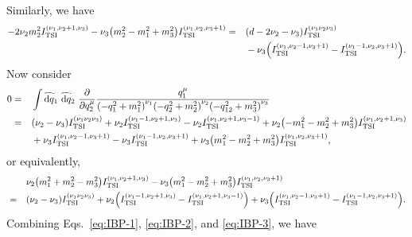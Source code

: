 \documentclass{article}
\begin{document}
        Similarly, we have
        \begin{equation}
            \begin{aligned}
                -2 \nu_2 m_2^2 \TSI{\nu_1, \nu_2 + 1, \nu_3} - \nu_3 \qty(m_2^2 - m_1^2 + m_3^2) \TSI{\nu_1, \nu_2, \nu_3 + 1} & = & & \qty(d - 2 \nu_2 - \nu_3) \TSI{\nu_1 \nu_2 \nu_3} \\
                & & & {} - \nu_3 \qty(\TSI{\nu_1, \nu_2 - 1, \nu_3 + 1} - \TSI{\nu_1 - 1, \nu_2, \nu_3 + 1}). \\
            \end{aligned}
            \label{eq:IBP-2}
        \end{equation}
        Now consider
        \begin{equation}
            \begin{aligned}
                0 & = & & \int \tildedp{q_1} ~ \tildedp{q_2} ~ \pdv{q_2^\mu} \frac{q_1^\mu}{\qmOne* \qmTwo* \qmThree*} \\
                & = & & \qty(\nu_2 - \nu_3) \TSI{\nu_1 \nu_2 \nu_3} + \nu_2 \TSI{\nu_1 - 1, \nu_2 + 1, \nu_3} - \nu_2 \TSI{\nu_1, \nu_2 + 1, \nu_3 - 1} + \nu_2 \qty(-m_1^2 - m_2^2 + m_3^2) \TSI{\nu_1, \nu_2 + 1, \nu_3} \\
                & & & {} + \nu_3 \TSI{\nu_1, \nu_2 - 1, \nu_3 + 1} - \nu_3 \TSI{\nu_1 - 1, \nu_2, \nu_3 + 1} + \nu_3 \qty(m_1^2 - m_2^2 + m_3^2) \TSI{\nu_1, \nu_2, \nu_3 + 1},
            \end{aligned}
        \end{equation}
        or equivalently,
        \begin{equation}
            \begin{aligned}
                & & & \nu_2 \qty(m_1^2 + m_2^2 - m_3^2) \TSI{\nu_1, \nu_2 + 1, \nu_3} - \nu_3 \qty(m_1^2 - m_2^2 + m_3^2) \TSI{\nu_1, \nu_2, \nu_3 + 1} \\
                & = & & \qty(\nu_2 - \nu_3) \TSI{\nu_1 \nu_2 \nu_3} + \nu_2 \qty(\TSI{\nu_1 - 1, \nu_2 + 1, \nu_3} - \TSI{\nu_1, \nu_2 + 1, \nu_3 - 1}) + \nu_3 \qty(\TSI{\nu_1, \nu_2 - 1, \nu_3 + 1} - \TSI{\nu_1 - 1, \nu_2, \nu_3 + 1}).
            \end{aligned}
            \label{eq:IBP-3}
        \end{equation}
        Combining Eqs.~\eqref{eq:IBP-1}, \eqref{eq:IBP-2}, and \eqref{eq:IBP-3}, we have
\end{document}
